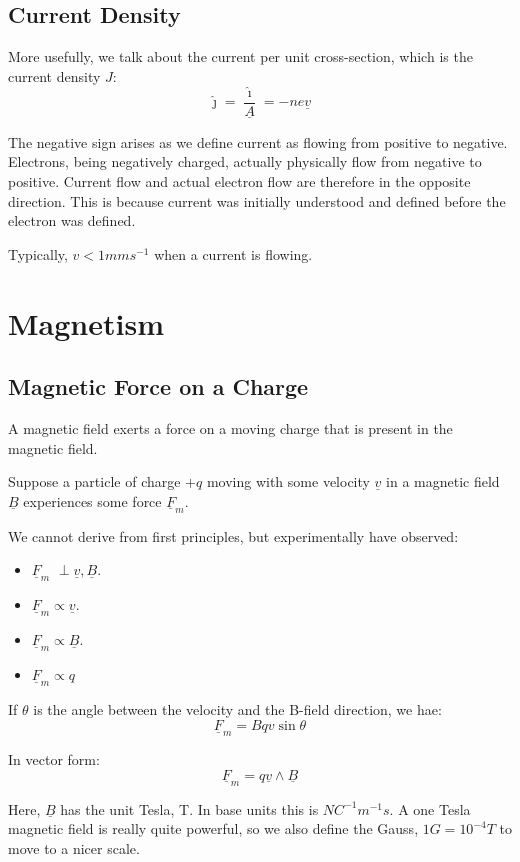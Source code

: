 \subsection{Current Density}
More usefully, we talk about the current per unit cross-section, which is the current density $J$:
\[
    \hat{\jmath} = \frac{\hat{\imath}}{\underline{A}} = -ne \underline{v}
\]

The negative sign arises as we define current as flowing from positive to negative. Electrons, being negatively charged, actually physically flow from negative to positive. Current flow and actual electron flow are therefore in the opposite direction. This is because current was initially understood and defined before the electron was defined.

Typically, $v < 1 \si{mm s^{-1}}$ when a current is flowing.

\section{Magnetism}
\subsection{Magnetic Force on a Charge}
A magnetic field exerts a force on a moving charge that is present in the magnetic field.

Suppose a particle of charge $+q$ moving with some velocity $\underline{v}$ in a magnetic field $\underline{B}$ experiences some force $\underline{F}_m$.

We cannot derive from first principles, but experimentally have observed:
\begin{itemize}
    \item $\underline{F}_m $ $\perp \underline{v}, \underline{B}$.
    \item $\underline{F}_m \propto \underline{v}$.
    \item $\underline{F}_m \propto \underline{B}$.
    \item $\underline{F}_m \propto q$
\end{itemize}

If $\theta$ is the angle between the velocity and the B-field direction, we hae:
\[
    \boxed{\underline{F}_m = Bqv \sin \theta}
\]

In vector form:
\[
    \boxed{\underline{F}_m = q \underline{v} \wedge \underline{B}}
\]

Here, $\underline{B}$ has the unit Tesla, T. In base units this is $\si{N C^{-1} m^{-1} s}$. A one Tesla magnetic field is really quite powerful, so we also define the Gauss, $1 \si{G} = 10^{-4} \si{T}$ to move to a nicer scale.

